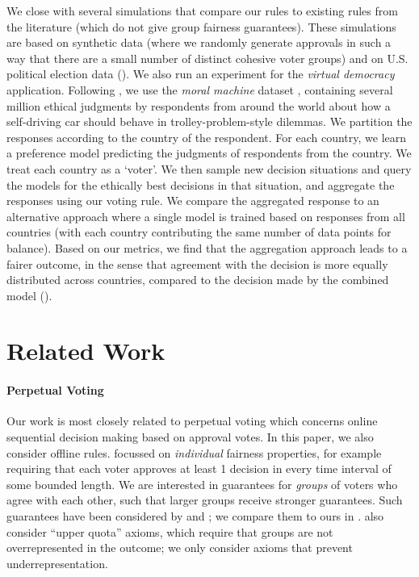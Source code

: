 \documentclass[10pt]{scrartcl}
\theoremstyle{plain}
\theoremstyle{definition}
\begin{document}
We close with several simulations that compare our rules to existing rules from the literature (which do not give group fairness guarantees). 
These simulations are based on synthetic data (where we randomly generate approvals in such a way that there are a small number of distinct cohesive voter groups) and on U.S. political election data ().
We also run an experiment for the \emph{virtual democracy} application. Following \citet{noothigattu2018voting}, we use the \emph{moral machine} dataset \citet{awad2018moral}, containing several million ethical judgments by respondents from around the world about how a self-driving car should behave in trolley-problem-style dilemmas. We partition the responses according to the country of the respondent. For each country, we learn a preference model predicting the judgments of respondents from the country. We treat each country as a `voter'. We then sample new decision situations and query the models for the ethically best decisions in that situation, and aggregate the responses using our voting rule. We compare the aggregated response to an alternative approach where a single model is trained based on responses from all countries (with each country contributing the same number of data points for balance). Based on our metrics, we find that the aggregation approach leads to a fairer outcome, in the sense that agreement with the decision is more equally distributed across countries, compared to the decision made by the combined model ().



 \newpage
\section{Related Work}
\label{sec:related}

\paragraph{Perpetual Voting}
Our work is most closely related to perpetual voting \citep{lackner2020perpetual} which concerns online sequential decision making based on approval votes. In this paper, we also consider offline rules. \citet{lackner2020perpetual} focussed on \emph{individual} fairness properties, for example requiring that each voter approves at least 1 decision in every time interval of some bounded length. We are interested in guarantees for \emph{groups} of voters who agree with each other, such that larger groups receive stronger guarantees. Such guarantees have been considered by \citet{lacknermaly2023} and \citet{bulteau2021jr}; we compare them to ours in . \citet{lacknermaly2023} also consider ``upper quota'' axioms, which require that groups are not overrepresented in the outcome; we only consider axioms that prevent underrepresentation.
\end{document}
